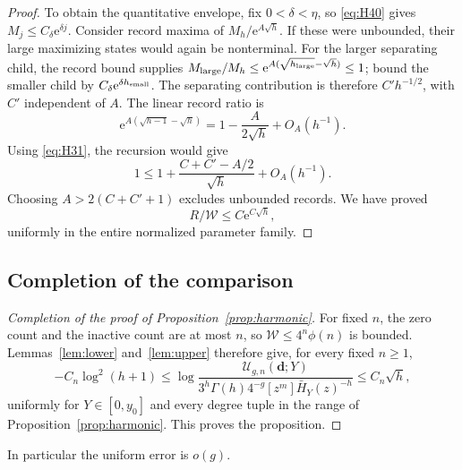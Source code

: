 \begin{proof}
To obtain the quantitative envelope, fix \(0<\delta<\eta\), so \eqref{eq:H40}
gives \(M_j\le C_\delta \mathrm{e}^{\delta j}\). Consider record maxima of
\(M_h/\mathrm{e}^{A\sqrt h}\). If these were unbounded, their large maximizing
states would again be nonterminal. For the larger separating child, the
record bound supplies
\(M_{\rm large}/M_h\le \mathrm{e}^{A(\sqrt{h_{\rm large}}-\sqrt h)}\le1\); bound
the smaller child by \(C_\delta \mathrm{e}^{\delta h_{\rm small}}\). The
separating contribution is therefore \(C'h^{-1/2}\), with \(C'\)
independent of \(A\). The linear record ratio is \[
\mathrm{e}^{A(\sqrt{h-1}-\sqrt h)}
=1-\frac{A}{2\sqrt h}+O_A(h^{-1}).
\] Using \eqref{eq:H31}, the recursion would give \[
1\le1+\frac{C+C'-A/2}{\sqrt h}+O_A(h^{-1}).
\] Choosing \(A>2(C+C'+1)\) excludes unbounded records. We have proved
\begin{equation}
R/\mathcal W\le C \mathrm{e}^{C\sqrt h},
\label{eq:H41}
\end{equation} uniformly in the entire normalized parameter family.
\end{proof}

\subsection{Completion of the comparison}\label{common-comparison-theorem-and-the-original-coefficients}

\begin{proof}[Completion of the proof of Proposition~\ref{prop:harmonic}]
For fixed \(n\), the zero count and the inactive count are at most \(n\), so
\(\mathcal W\le4^n\phi(n)\) is bounded. Lemmas~\ref{lem:lower}
and~\ref{lem:upper} therefore give, for every fixed \(n\ge1\), \begin{equation}
-C_n\log^2(h+1)\le
\log\frac{\mathcal U_{g,n}(\mathbf d;Y)}
 {3^h\Gamma(h)4^{-g}[z^m]\bar H_Y(z)^{-h}}
\le C_n\sqrt h,\label{eq:H42}
\end{equation} uniformly for \(Y\in[0,y_0]\) and every degree tuple
in the range of Proposition~\ref{prop:harmonic}. This proves the proposition.
\end{proof}

In particular the uniform error is \(o(g)\).

